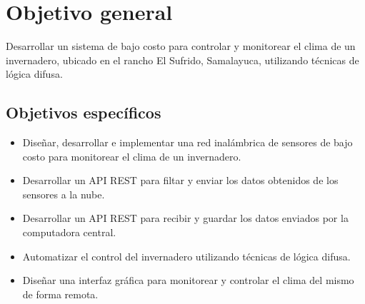 \section{Objetivo general}
Desarrollar un sistema de bajo costo para controlar y monitorear el clima de un invernadero, ubicado en el rancho El Sufrido, Samalayuca, utilizando técnicas de lógica difusa.

\subsection{Objetivos específicos}
\begin{itemize}
	\item Diseñar, desarrollar e implementar una red inalámbrica de sensores de bajo costo para monitorear el clima de un invernadero.
	\item Desarrollar un API REST para filtar y enviar los datos obtenidos de los sensores a la nube.
	\item Desarrollar un API REST para recibir y guardar los datos enviados por la computadora central.
	\item Automatizar el control del invernadero utilizando técnicas de lógica difusa.
	\item Diseñar una interfaz gráfica para monitorear y controlar el clima del mismo de forma remota.
\end{itemize}